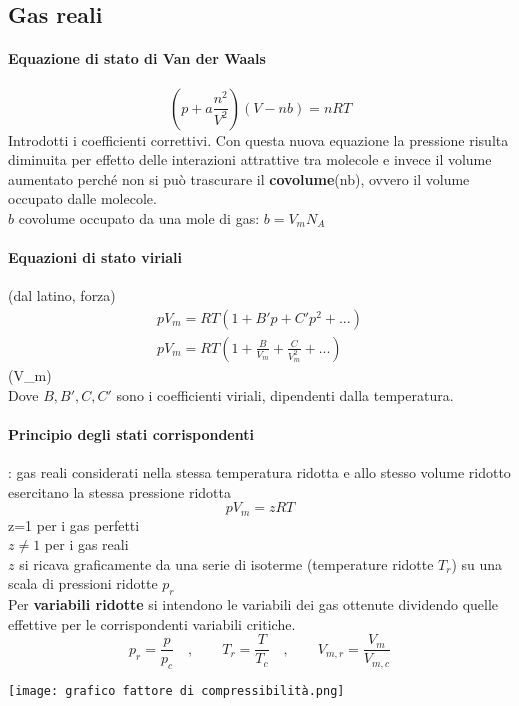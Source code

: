 \documentclass{article}
\begin{document}
\subsection{Gas reali}
\paragraph{Equazione di stato di Van der Waals}
\begin{equation}
    (p+a\frac{n^2}{V^2})(V-nb)=nRT
\end{equation}
Introdotti i coefficienti correttivi. Con questa nuova equazione la pressione risulta diminuita per effetto delle interazioni attrattive tra molecole e invece il volume aumentato perché non si può trascurare il \textbf{covolume}(nb), ovvero il volume occupato dalle molecole.
\\ $b$ covolume occupato da una mole di gas: $b=V_mN_A$

\paragraph{Equazioni di stato viriali} (dal latino, forza)
\begin{equation*}
\begin{split}
    pV_m=RT(1+B'p+C'p^2+...)\\
    pV_m=RT(1+\frac{B}{V_m}+\frac{C}{V_m^2}+...)
\end{split}
\end{equation*}
(\gls{V_m})\\
Dove $B,B',C,C'$ sono i coefficienti viriali, dipendenti dalla temperatura.

\paragraph{Principio degli stati corrispondenti}: gas reali considerati nella stessa temperatura ridotta e allo stesso volume ridotto esercitano la stessa pressione ridotta
\begin{equation*}
    pV_m=zRT
\end{equation*}
\gls{z}=1 per i gas perfetti\\
$z\neq 1$ per i gas reali\\
$z$ si ricava graficamente da una serie di isoterme (temperature ridotte $T_r$) su una scala di pressioni ridotte $p_r$\\
Per \textbf{variabili ridotte} si intendono le variabili dei gas ottenute dividendo quelle effettive per le corrispondenti variabili critiche.
\begin{equation*}
    p_r=\frac{p}{p_c} \quad, \quad \quad T_r=\frac{T}{T_c}\quad, \quad \quad V_{m,r}=\frac{V_m}{V_{m,c}}
\end{equation*}
\begin{center}
    \texttt{[image: grafico fattore di compressibilità.png]}
\end{center}
\end{document}
